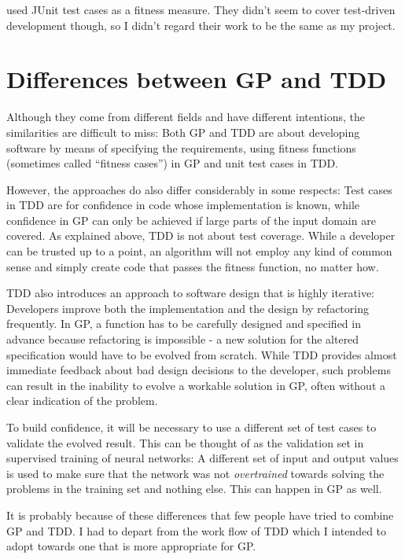 \documentclass[a4paper]{article}
\begin{document}
\cite{oppacheretal2009} used JUnit test cases as a fitness
measure. They didn't seem to cover test-driven development though, so
I didn't regard their work to be the same as my project.

\section{Differences between GP and TDD}

Although they come from different fields and have different
intentions, the similarities are difficult to miss: Both GP and TDD
are about developing software by means of specifying the requirements,
using fitness functions (sometimes called ``fitness cases'') in GP and
unit test cases in TDD.

However, the approaches do also differ considerably in some respects:
Test cases in TDD are for confidence in code whose implementation is
known, while confidence in GP can only be achieved if large parts of
the input domain are covered. As explained above, TDD is not about
test coverage. While a developer can be trusted up to a point, an
algorithm will not employ any kind of common sense and simply create
code that passes the fitness function, no matter how.

TDD also introduces an approach to software design that is highly
iterative: Developers improve both the implementation and the design
by refactoring frequently. In GP, a function has to be carefully
designed and specified in advance because refactoring is impossible -
a new solution for the altered specification would have to be evolved
from scratch. While TDD provides almost immediate feedback about bad
design decisions to the developer, such problems can result in the
inability to evolve a workable solution in GP, often without a clear
indication of the problem.

To build confidence, it will be necessary to use a different set of
test cases to validate the evolved result. This can be thought of as
the validation set in supervised training of neural networks: A
different set of input and output values is used to make sure that the
network was not \emph{overtrained} towards solving the problems in the
training set and nothing else. This can happen in GP as well.

It is probably because of these differences that few people have tried
to combine GP and TDD. I had to depart from the work flow of TDD which
I intended to adopt towards one that is more appropriate for GP.
\end{document}
